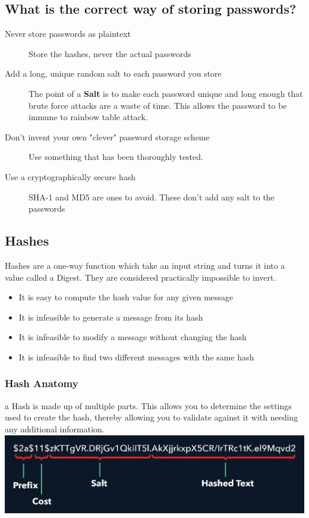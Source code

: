 \documentclass[a4paper, titlepage]{article}
\begin{document}
\subsection{What is the correct way of storing passwords?}
\begin{description}
    \item [Never store passwords as plaintext] Store the hashes, never the actual passwords
    \item [Add a long, unique random salt to each password you store] The point of a \textbf{Salt} is to make each password unique and long enough that brute force attacks are a waste of time. This allows the password to be immune to rainbow table attack.
    \item [Don't invent your own "clever" password storage scheme] Use something that has been thoroughly tested.
    \item [Use a cryptographically secure hash] SHA-1 and MD5 are ones to avoid. These don't add any salt to the passwords
\end{description}

\subsection{Hashes}
Hashes are a one-way function which take an input string and turns it into a value called a Digest. They are considered practically impossible to invert.

\begin{itemize}
    \item It is easy to compute the hash value for any given message
    \item It is infeasible to generate a message from its hash
    \item It is infeasible to modify a message without changing the hash
    \item It is infeasible to find two different messages with the same hash
\end{itemize}
\subsubsection{Hash Anatomy}
a Hash is made up of multiple parts. This allows you to determine the settings used to create the hash, thereby allowing you to validate against it with needing any additional information.
\newline
\newline
\includegraphics[width=\textwidth]{hash-anatomy}
\end{document}
